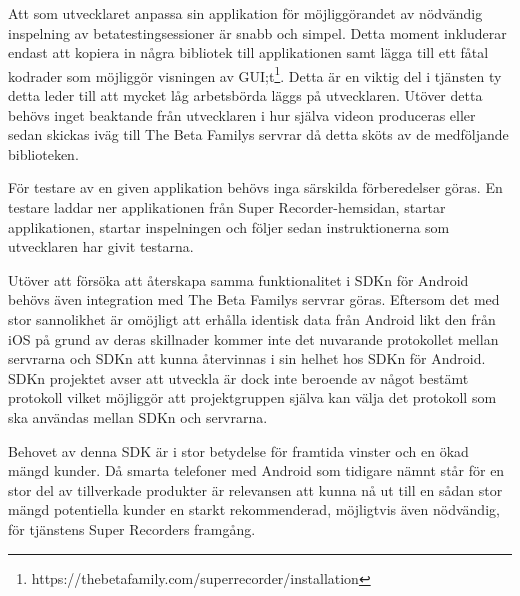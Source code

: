Att som utvecklaret anpassa sin applikation för möjliggörandet av nödvändig inspelning av betatestingsessioner är snabb och simpel. Detta moment inkluderar endast att kopiera in några bibliotek till applikationen samt lägga till ett fåtal kodrader som möjliggör visningen av GUI;t\footnote{https://thebetafamily.com/superrecorder/installation}. Detta är en viktig del i tjänsten ty detta leder till att mycket låg arbetsbörda läggs på utvecklaren. Utöver detta behövs inget beaktande från utvecklaren i hur själva videon produceras eller sedan skickas iväg till The Beta Familys servrar då detta sköts av de medföljande biblioteken. 

För testare av en given applikation behövs inga särskilda förberedelser göras. En testare laddar ner applikationen från Super Recorder-hemsidan, startar applikationen, startar inspelningen och följer sedan instruktionerna som utvecklaren har givit testarna. 

Utöver att försöka att återskapa samma funktionalitet i SDKn för Android behövs även integration med The Beta Familys servrar göras. Eftersom det med stor sannolikhet är omöjligt att erhålla identisk data från Android likt den från iOS på grund av deras skillnader kommer inte det nuvarande protokollet mellan servrarna och SDKn att kunna återvinnas i sin helhet hos SDKn för Android. SDKn projektet avser att utveckla är dock inte beroende av något bestämt protokoll vilket möjliggör att projektgruppen själva kan välja det protokoll som ska användas mellan SDKn och servrarna.

Behovet av denna SDK är i stor betydelse för framtida vinster och en ökad mängd kunder. Då smarta telefoner med Android som tidigare nämnt står för en stor del av tillverkade produkter är relevansen att kunna nå ut till en sådan stor mängd potentiella kunder en starkt rekommenderad, möjligtvis även nödvändig, för tjänstens Super Recorders framgång.
